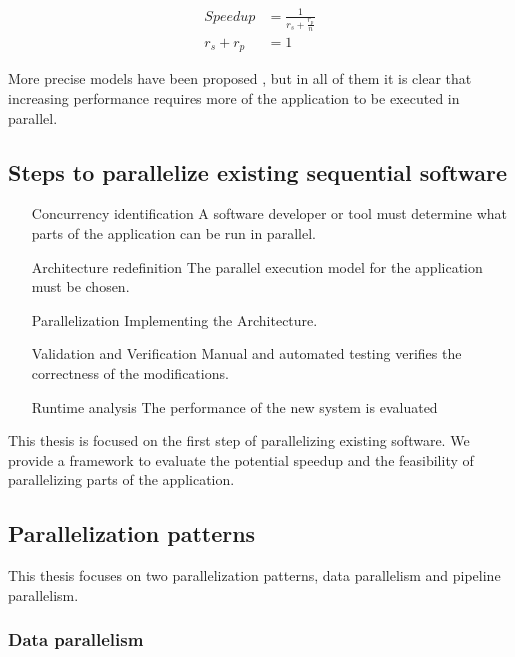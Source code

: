 \begin{equation} \label{eq:ahmdahl}
	\begin{aligned}
		Speedup &= \frac{1}{r_s + \frac{r_p}{n}} \\
		r_s + r_p &= 1
	\end{aligned}
\end{equation}

More precise models have been proposed \cite{gustafson}, but in all of them it is clear that increasing performance requires more of the application to be executed in parallel.

\subsection{Steps to parallelize existing sequential software}

\begin{enumerate}[\hspace{80pt}(P1)]
	\item [Concurrency identification] A software developer or tool must determine what parts of the application can be run in parallel.
	\item [Architecture redefinition] The parallel execution model for the application must be chosen.
	\item [Parallelization] Implementing the Architecture.
	\item [Validation and Verification] Manual and automated testing verifies the correctness of the modifications.
	\item [Runtime analysis] The performance of the new system is evaluated
\end{enumerate}

This thesis is focused on the first step of parallelizing existing software. We provide a framework to evaluate the potential speedup and the feasibility of parallelizing parts of the application.

\subsection{Parallelization patterns}

This thesis focuses on two parallelization patterns, data parallelism and pipeline parallelism.

\subsubsection{Data parallelism}

